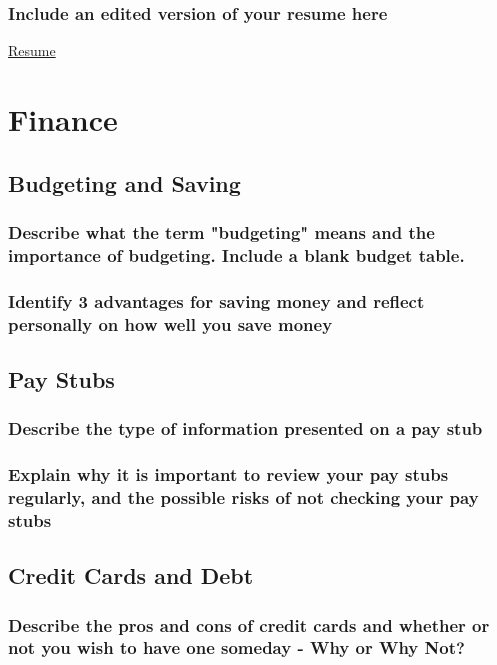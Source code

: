 \documentclass[11pt]{article}
\begin{document}
\subsubsection*{Include an edited version of your resume here}
\label{sec:org8706bf0}
\href{file:///home/kadin/Downloads/Kadin\%20Parker\%20Resume\%20-\%20Any.pdf}{Resume}
\section*{Finance}
\label{sec:orgd9e638a}
\subsection*{Budgeting and Saving}
\label{sec:orgb41b133}
\subsubsection*{Describe what the term "budgeting" means and the importance of budgeting. Include a blank budget table.}
\label{sec:org6fdeb0b}

\subsubsection*{Identify 3 advantages for saving money and reflect personally on how well you save money}
\label{sec:org57d10b7}
\subsection*{Pay Stubs}
\label{sec:org6e05421}
\subsubsection*{Describe the type of information presented on a pay stub}
\label{sec:org79611fd}
\subsubsection*{Explain why it is important to review your pay stubs regularly, and the possible risks of not checking your pay stubs}
\label{sec:org1d1dade}
\subsection*{Credit Cards and Debt}
\label{sec:orgba9d41b}
\subsubsection*{Describe the pros and cons of credit cards and whether or not you wish to have one someday - Why or Why Not?}
\label{sec:orgc36a51d}
\end{document}
